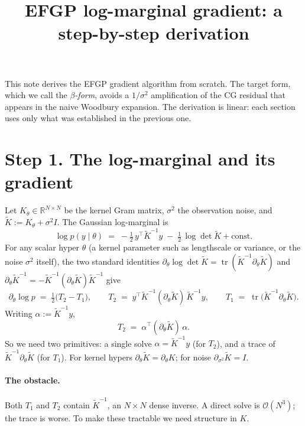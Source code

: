 \documentclass[11pt]{article}
\title{EFGP log-marginal gradient: a step-by-step derivation}
\author{}
\date{}
\numberwithin{equation}{section}
\newcommand{\tr}{\operatorname{tr}}
\newcommand{\bigo}{\mathcal{O}}
\newcommand{\Ktil}{\widetilde K}
\begin{document}
\maketitle

\noindent This note derives the EFGP gradient algorithm from scratch. The target
form, which we call the \emph{$\beta$-form}, avoids a $1/\sigma^2$ amplification
of the CG residual that appears in the naive Woodbury expansion. The derivation
is linear: each section uses only what was established in the previous one.

\section{Step 1. The log-marginal and its gradient}

Let $K_\theta\in\mathbb{R}^{N\times N}$ be the kernel Gram matrix, $\sigma^2$ the
observation noise, and $\Ktil := K_\theta + \sigma^2 I$. The Gaussian
log-marginal is
\[
  \log p(y\mid\theta) \;=\; -\tfrac12\,y^\top \Ktil^{-1}y
                          \;-\; \tfrac12\,\log\det\Ktil + \text{const}.
\]
For any scalar hyper $\theta$ (a kernel parameter such as lengthscale or
variance, or the noise $\sigma^2$ itself), the two standard identities
$\partial_\theta\log\det\Ktil = \tr(\Ktil^{-1}\partial_\theta\Ktil)$ and
$\partial_\theta\Ktil^{-1} = -\Ktil^{-1}(\partial_\theta\Ktil)\Ktil^{-1}$ give
\begin{equation}
  \partial_\theta\log p \;=\; \tfrac12\bigl(T_2 - T_1\bigr),\qquad
  T_2 \;=\; y^\top \Ktil^{-1}(\partial_\theta\Ktil)\,\Ktil^{-1}y,\qquad
  T_1 \;=\; \tr\!\bigl(\Ktil^{-1}\partial_\theta\Ktil\bigr).
  \label{eq:gradient}
\end{equation}
Writing $\alpha := \Ktil^{-1}y$,
\begin{equation}
  T_2 \;=\; \alpha^\top(\partial_\theta\Ktil)\,\alpha. \label{eq:T2alpha}
\end{equation}
So we need two primitives: a single solve $\alpha = \Ktil^{-1}y$ (for $T_2$), and
a trace of $\Ktil^{-1}\partial_\theta\Ktil$ (for $T_1$).
For kernel hypers $\partial_\theta\Ktil = \partial_\theta K$; for noise
$\partial_{\sigma^2}\Ktil = I$.

\paragraph{The obstacle.} Both $T_1$ and $T_2$ contain $\Ktil^{-1}$, an $N\times
N$ dense inverse. A direct solve is $\bigo(N^3)$; the trace is worse. To make
these tractable we need structure in $K$.
\end{document}
